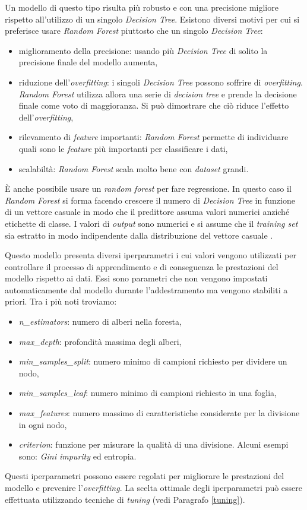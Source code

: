 \documentclass[12pt,italian]{report}
\begin{document}
	Un modello di questo tipo risulta più robusto e con una precisione migliore rispetto all'utilizzo di un singolo \textit{Decision Tree}. Esistono diversi motivi per cui si preferisce usare \textit{Random Forest} piuttosto che un singolo \textit{Decision Tree}:
	\begin{itemize}
		\item miglioramento della precisione: usando più \textit{Decision Tree} di solito la precisione finale del modello aumenta,
		\item riduzione dell'\textit{overfitting}: i singoli \textit{Decision Tree} possono soffrire di \textit{overfitting}. \textit{Random Forest} utilizza allora una serie di \textit{decision tree} e prende la decisione finale come voto di maggioranza. Si può dimostrare che ciò riduce l'effetto dell'\textit{overfitting},
		\item rilevamento di \textit{feature} importanti: \textit{Random Forest} permette di individuare quali sono le \textit{feature} più importanti per classificare i dati,
		\item scalabiltà: \textit{Random Forest} scala molto bene con \textit{dataset} grandi.
	\end{itemize}
	È anche possibile usare un \textit{random forest} per fare regressione. In questo caso il \textit{Random Forest} si forma facendo crescere il numero di \textit{Decision Tree} in funzione di un vettore casuale in modo che il predittore assuma valori numerici anziché etichette di classe. I valori di \textit{output} sono numerici e si assume che il \textit{training set} sia estratto in modo indipendente dalla distribuzione del vettore casuale \cite{Breiman2001}.
	
	Questo modello presenta diversi iperparametri i cui valori vengono utilizzati per controllare il processo di apprendimento e di conseguenza le prestazioni del modello rispetto ai dati. Essi sono parametri che non vengono impostati automaticamente dal modello durante l'addestramento ma vengono stabiliti a priori. Tra i più noti troviamo:
	\begin{itemize}
		\item \textit{n\_estimators}: numero di alberi nella foresta,
		\item \textit{max\_depth}: profondità massima degli alberi,
		\item \textit{min\_samples\_split}: numero minimo di campioni richiesto per dividere un nodo,
		\item \textit{min\_samples\_leaf}: numero minimo di campioni richiesto in una foglia,
		\item \textit{max\_features}: numero massimo di caratteristiche considerate per la divisione in ogni nodo,
		\item \textit{criterion}: funzione per misurare la qualità di una divisione. Alcuni esempi sono: \textit{Gini impurity} ed entropia.
	\end{itemize} 
		Questi iperparametri possono essere regolati per migliorare le prestazioni del modello e prevenire l'\textit{overfitting}. La scelta ottimale degli iperparametri può essere effettuata utilizzando tecniche di \textit{tuning} (vedi Paragrafo \ref{tuning}).
	
\end{document}

